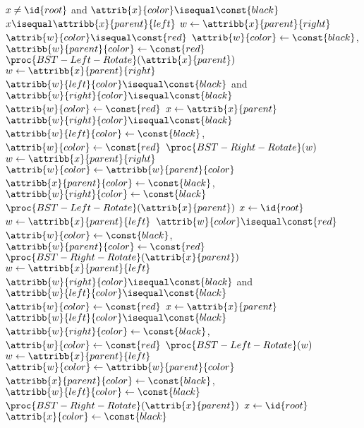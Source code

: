\begin{codebox}
\li \While $x \neq \id{root}$ and $\attrib{x}{color} \isequal \const{black}$ \Do
\li     \If $x \isequal \attribb{x}{parent}{left}$ \Then
\li         $w \gets \attribb{x}{parent}{right}$
\li         \If $\attrib{w}{color} \isequal \const{red}$ \Then
\li             $\attrib{w}{color} \gets \const{black}$, $\attribb{w}{parent}{color} \gets \const{red}$
\li             $\proc{BST-Left-Rotate}(\attrib{x}{parent})$
\li             $w \gets \attribb{x}{parent}{right}$
            \End
\li         \If $\attribb{w}{left}{color} \isequal \const{black}$ and $\attribb{w}{right}{color} \isequal \const{black}$ \Then
\li             $\attrib{w}{color} \gets \const{red}$
\li             $x \gets \attrib{x}{parent}$
\li         \ElseNoIf
\li             \If $\attribb{w}{right}{color} \isequal \const{black}$ \Then
\li                 $\attribb{w}{left}{color} \gets \const{black}$, $\attrib{w}{color} \gets \const{red}$
\li                 $\proc{BST-Right-Rotate}(w)$
\li                 $w \gets \attribb{x}{parent}{right}$
                \End
\li             $\attrib{w}{color} \gets \attribb{w}{parent}{color}$
\li             $\attribb{x}{parent}{color} \gets \const{black}$, $\attribb{w}{right}{color} \gets \const{black}$
\li             $\proc{BST-Left-Rotate}(\attrib{x}{parent})$
\li             $x \gets \id{root}$
            \End
\li     \ElseNoIf
\li         $w \gets \attribb{x}{parent}{left}$
\li         \If $\attrib{w}{color} \isequal \const{red}$ \Then
\li             $\attrib{w}{color} \gets \const{black}$, $\attribb{w}{parent}{color} \gets \const{red}$
\li             $\proc{BST-Right-Rotate}(\attrib{x}{parent})$
\li             $w \gets \attribb{x}{parent}{left}$
            \End
\li         \If $\attribb{w}{right}{color} \isequal \const{black}$ and $\attribb{w}{left}{color} \isequal \const{black}$ \Then
\li             $\attrib{w}{color} \gets \const{red}$
\li             $x \gets \attrib{x}{parent}$
\li         \ElseNoIf
\li             \If $\attribb{w}{left}{color} \isequal \const{black}$ \Then
\li                 $\attribb{w}{right}{color} \gets \const{black}$, $\attrib{w}{color} \gets \const{red}$
\li                 $\proc{BST-Left-Rotate}(w)$
\li                 $w \gets \attribb{x}{parent}{left}$
                \End
\li             $\attrib{w}{color} \gets \attribb{w}{parent}{color}$
\li             $\attribb{x}{parent}{color} \gets \const{black}$, $\attribb{w}{left}{color} \gets \const{black}$
\li             $\proc{BST-Right-Rotate}(\attrib{x}{parent})$
\li             $x \gets \id{root}$
            \End
        \End
    \End
\li $\attrib{x}{color} \gets \const{black}$
\end{codebox}

